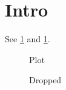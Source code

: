 \documentclass{article}
\begin{document}

\section{Intro}\label{sec:intro}
See \ref{sec:intro} and \ref{fig:plot}.
\begin{figure}\caption{Plot}\label{fig:plot}\end{figure}
\begin{figure}\caption{Dropped}\label{fig:dropped}\end{figure}
\end{document}
